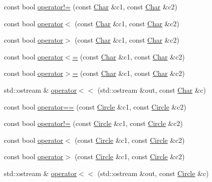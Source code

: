 \begin{DoxyCompactItemize}
\item 
const bool \hyperlink{namespaceprism_a249b6933154570d808cdd405ab1fd89b}{operator!=} (const \hyperlink{classprism_1_1_char}{Char} \&c1, const \hyperlink{classprism_1_1_char}{Char} \&c2)
\item 
const bool \hyperlink{namespaceprism_a2fc3e64ba36a16f24cb0ae387c83f35f}{operator$<$} (const \hyperlink{classprism_1_1_char}{Char} \&c1, const \hyperlink{classprism_1_1_char}{Char} \&c2)
\item 
const bool \hyperlink{namespaceprism_ab8a312729c4c9ae72836d0034a6f0758}{operator$>$} (const \hyperlink{classprism_1_1_char}{Char} \&c1, const \hyperlink{classprism_1_1_char}{Char} \&c2)
\item 
const bool \hyperlink{namespaceprism_a87d86e9266469c8a40537e12a560b066}{operator$<$=} (const \hyperlink{classprism_1_1_char}{Char} \&c1, const \hyperlink{classprism_1_1_char}{Char} \&c2)
\item 
const bool \hyperlink{namespaceprism_aad049ddef9beb3fec3e7057a7f651280}{operator$>$=} (const \hyperlink{classprism_1_1_char}{Char} \&c1, const \hyperlink{classprism_1_1_char}{Char} \&c2)
\item 
std\+::ostream \& \hyperlink{namespaceprism_aa67ea1154a35dabe9c2c232aff65e930}{operator$<$$<$} (std\+::ostream \&out, const \hyperlink{classprism_1_1_char}{Char} \&c)
\item 
const bool \hyperlink{namespaceprism_a0ce1ad6e6392618212d5ab3bebb8e585}{operator==} (const \hyperlink{classprism_1_1_circle}{Circle} \&c1, const \hyperlink{classprism_1_1_circle}{Circle} \&c2)
\item 
const bool \hyperlink{namespaceprism_a58cbf7ef406800002b446a0f1e917745}{operator!=} (const \hyperlink{classprism_1_1_circle}{Circle} \&c1, const \hyperlink{classprism_1_1_circle}{Circle} \&c2)
\item 
const bool \hyperlink{namespaceprism_a8e662d15b162ca76912c491798caefd3}{operator$<$} (const \hyperlink{classprism_1_1_circle}{Circle} \&c1, const \hyperlink{classprism_1_1_circle}{Circle} \&c2)
\item 
const bool \hyperlink{namespaceprism_a671739ac8567654dba563c34af92213f}{operator$>$} (const \hyperlink{classprism_1_1_circle}{Circle} \&c1, const \hyperlink{classprism_1_1_circle}{Circle} \&c2)
\item 
std\+::ostream \& \hyperlink{namespaceprism_aa63d3d39d3fad8fa5c5966cc4f306324}{operator$<$$<$} (std\+::ostream \&out, const \hyperlink{classprism_1_1_circle}{Circle} \&c)
\item 

\end{DoxyCompactItemize}
